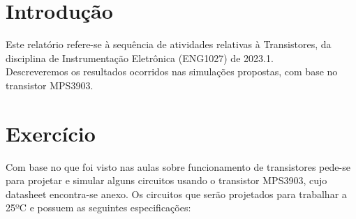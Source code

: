 \documentclass[a4paper, 12pt]{article}
\begin{document}

\newpage
\tableofcontents
\thispagestyle{empty}

\newpage
{}

\newpage


\newpage


\newpage

\listoffigures
\thispagestyle{empty}

\newpage

\newpage

\thispagestyle{empty}

\newpage


\section*{Introdução}
Este relatório refere-se à sequência de atividades relativas à Transistores, da disciplina de Instrumentação Eletrônica (ENG1027) de 2023.1. \\

Descreveremos os resultados ocorridos nas simulações propostas, com base no transistor MPS3903.\\

\section{Exercício}

Com base no que foi visto nas aulas sobre funcionamento de transistores pede-se para projetar e 
simular alguns circuitos usando o transistor MPS3903, cujo datasheet encontra-se anexo. Os circuitos 
que serão projetados para trabalhar a 25ºC e possuem as seguintes especificações: \\


\end{document}
